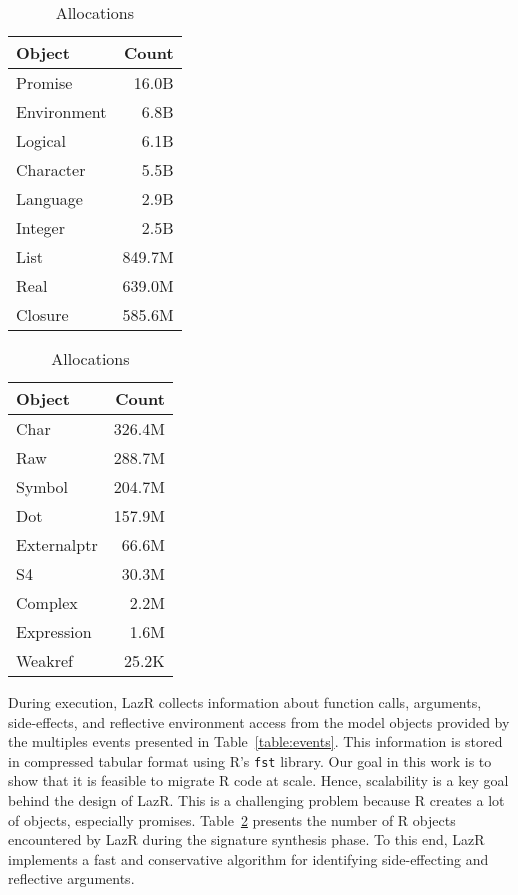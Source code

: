 \documentclass[review,nonacm,screen,acmsmall,anonymous=true]{acmart}
\renewcommand{\c}[1]{\lstinline |#1|\xspace}
\newcommand{\lazr}{{\sf LazR}\xspace}
\begin{document}
\begin{table}
  \vspace{-3mm}
  \small
  \caption{Allocations} \label{table:allocations}
  \centering
  \begin{tabular}{lr}
    \toprule
    \bf Object&\bf Count\\
    \midrule
    Promise&16.0B\\
    Environment&6.8B\\
    Logical&6.1B\\
    Character&5.5B\\
    Language&2.9B\\
    Integer&2.5B\\
    List&849.7M\\
    Real&639.0M\\
    Closure&585.6M\\
    \bottomrule
  \end{tabular}
  \begin{tabular}{lr}
    \toprule
    \bf Object&\bf Count\\
    \midrule
    Char&326.4M\\
    Raw&288.7M\\
    Symbol&204.7M\\
    Dot&157.9M\\
    Externalptr&66.6M\\
    S4&30.3M\\
    Complex&2.2M\\
    Expression&1.6M\\
    Weakref&25.2K\\
    \bottomrule
  \end{tabular}
\end{table}

During execution, \lazr collects information about function calls, arguments,
side-effects, and reflective environment access from the model objects provided
by the multiples events presented in Table~\ref{table:events}. This information
is stored in compressed tabular format using R's \c{fst} library.
Our goal in this work is to show that it is feasible to migrate R code at scale.
Hence, scalability is a key goal behind the design of \lazr. This is a
challenging problem because R creates a lot of objects, especially promises.
Table~\ref{table:allocations} presents the number of R objects encountered by
\lazr during the signature synthesis phase. To this end, \lazr implements a fast
and conservative algorithm for identifying side-effecting and reflective
arguments.
\end{document}
